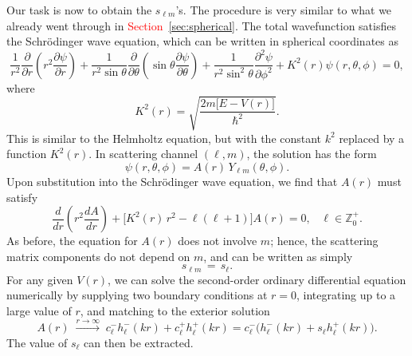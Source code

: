 \documentclass[pra,12pt]{revtex4}
\begin{document}
Our task is now to obtain the $s_{\ell m}$'s.  The procedure is very
similar to what we already went through in
\textcolor{red}{Section~\ref{sec:spherical}}.  The total wavefunction satisfies the
Schr\"odinger wave equation, which can be written in spherical
coordinates as
\begin{equation}
  \frac{1}{r^2}\frac{\partial}{\partial r}\left(r^2\frac{\partial \psi}{\partial r}\right) + \frac{1}{r^2\sin\theta}\frac{\partial}{\partial\theta}\left(\sin\theta\frac{\partial\psi}{\partial\theta}\right)+\frac{1}{r^2\sin^2\theta}\frac{\partial^2\psi}{\partial\phi^2} + K^2(r) \psi(r,\theta,\phi) = 0,
\end{equation}
where
\begin{equation}
  K^2(r) = \sqrt{\frac{2m\big[E-V(r)\big]}{\hbar^2}}.
\end{equation}
This is similar to the Helmholtz equation, but with the constant $k^2$
replaced by a function $K^2(r)$.  In scattering channel $(\ell,m)$,
the solution has the form
\begin{equation}
  \psi(r,\theta,\phi) = A(r) \, Y_{\ell m}(\theta, \phi).
\end{equation}
Upon substitution into the Schr\"odinger wave equation, we find that
$A(r)$ must satisfy
\begin{equation}
  \frac{d}{dr}\left(r^2\frac{dA}{dr}\right) + \Big[K^2(r)\, r^2 - \ell(\ell+1)\Big] A(r) = 0, \;\;\;\ell \in \mathbb{Z}_0^+.
\end{equation}
As before, the equation for $A(r)$ does not involve $m$; hence, the
scattering matrix components do not depend on $m$, and can be written
as simply
\begin{equation}
  s_{\ell m} \,=\, s_\ell.
\end{equation}
For any given $V(r)$, we can solve the second-order ordinary
differential equation numerically by supplying two boundary conditions
at $r=0$, integrating up to a large value of $r$, and matching to the
exterior solution
\begin{equation}
  A(r) \; \overset{r\rightarrow\infty}{\longrightarrow} \; c^-_\ell h^-_\ell(kr) + c^+_\ell h^+_\ell(kr) = c^-_\ell \Big(h^-_\ell(kr) + s_\ell h^+_\ell(kr)\Big).
\end{equation}
The value of $s_\ell$ can then be extracted.
\end{document}

